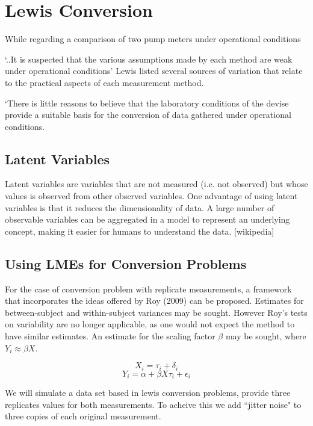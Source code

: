 \documentclass[MAIN.tex]{subfiles}
\begin{document}
	\section{Lewis Conversion} 
	While regarding a comparison of two pump meters under operational conditions
	
	‘..It is suspected that the various assumptions made by each method are weak under operational conditions’
	Lewis listed several sources of variation that relate to the practical aspects of each measurement method.
	
	‘There is little reasons to believe that the laboratory conditions of the devise provide a suitable basis for the conversion of data gathered under operational conditions.
	
	\subsection{Latent Variables}
	Latent variables are variables that are not measured (i.e. not observed) but whose values is observed from other observed variables. One advantage of using latent variables is that it reduces the dimensionality of data. A large number of observable variables can be aggregated in a model to represent an underlying concept, making it easier for humans to understand the data.	[wikipedia]

	\subsection{Using LMEs for Conversion Problems}
	For the case of conversion problem with replicate measurements, a framework that incorporates the ideas offered by Roy (2009) can be proposed. Estimates for between-subject and within-subject variances may be sought.
	However Roy's tests on variability are no longer applicable, as one would not expect the method to have similar estimates. An estimate for the scaling factor $\beta$ may be sought, where $Y_i \approx \beta X$.
	
	
	\[ X_i = \tau_i + \delta_i \]
	\[ Y_i = \alpha + \beta X \tau_i + \epsilon_i\]
	
	
	We will simulate a data set based in lewis conversion problems, provide three replicates values for both measurements. To acheive this we add ``jitter noise" to three copies of each original measurement.


\end{document}

